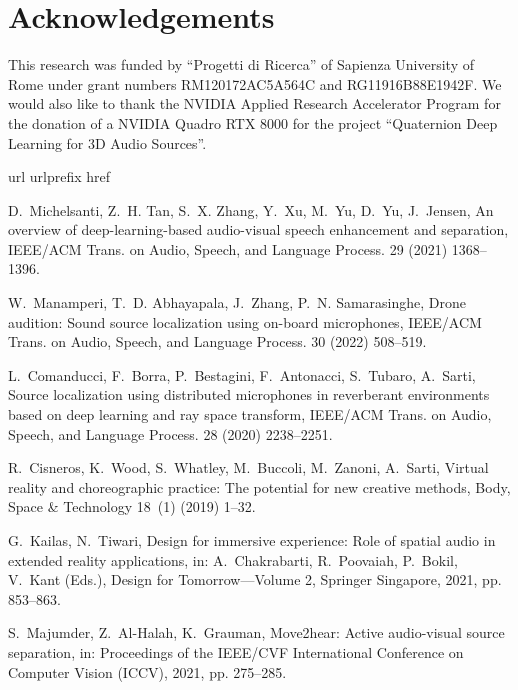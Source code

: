 \documentclass[3p, preprint, twocolumn]{elsarticle}
\begin{document}
\section*{Acknowledgements}

This research was funded by ``Progetti di Ricerca'' of Sapienza University of Rome under grant numbers RM120172AC5A564C and RG11916B88E1942F. We would also like to thank the NVIDIA Applied Research Accelerator Program for the donation of a NVIDIA Quadro RTX 8000 for the project ``Quaternion Deep Learning for 3D Audio Sources''.

\balance
\begin{thebibliography}{10}
\expandafter\ifx\csname url\endcsname\relax
  \def\url#1{\texttt{#1}}\fi
\expandafter\ifx\csname urlprefix\endcsname\relax\def\urlprefix{URL }\fi
\expandafter\ifx\csname href\endcsname\relax
  \def\href#1#2{#2} \def\path#1{#1}\fi

D.~Michelsanti, Z.~H. Tan, S.~X. Zhang, Y.~Xu, M.~Yu, D.~Yu, J.~Jensen, An
  overview of deep-learning-based audio-visual speech enhancement and
  separation, {IEEE/ACM} Trans. on Audio, Speech, and Language Process. 29
  (2021) 1368--1396.

W.~Manamperi, T.~D. Abhayapala, J.~Zhang, P.~N. Samarasinghe, Drone audition:
  Sound source localization using on-board microphones, {IEEE/ACM} Trans. on
  Audio, Speech, and Language Process. 30 (2022) 508--519.

L.~Comanducci, F.~Borra, P.~Bestagini, F.~Antonacci, S.~Tubaro, A.~Sarti,
  Source localization using distributed microphones in reverberant environments
  based on deep learning and ray space transform, {IEEE/ACM} Trans. on Audio,
  Speech, and Language Process. 28 (2020) 2238--2251.

R.~Cisneros, K.~Wood, S.~Whatley, M.~Buccoli, M.~Zanoni, A.~Sarti, Virtual
  reality and choreographic practice: The potential for new creative methods,
  Body, Space \& Technology 18~(1) (2019) 1--32.

G.~Kailas, N.~Tiwari, Design for immersive experience: Role of spatial audio in
  extended reality applications, in: A.~Chakrabarti, R.~Poovaiah, P.~Bokil,
  V.~Kant (Eds.), Design for Tomorrow---Volume 2, Springer Singapore, 2021, pp.
  853--863.

S.~Majumder, Z.~Al-Halah, K.~Grauman, Move2hear: Active audio-visual source
  separation, in: Proceedings of the IEEE/CVF International Conference on
  Computer Vision (ICCV), 2021, pp. 275--285.


\end{thebibliography}
\end{document}

